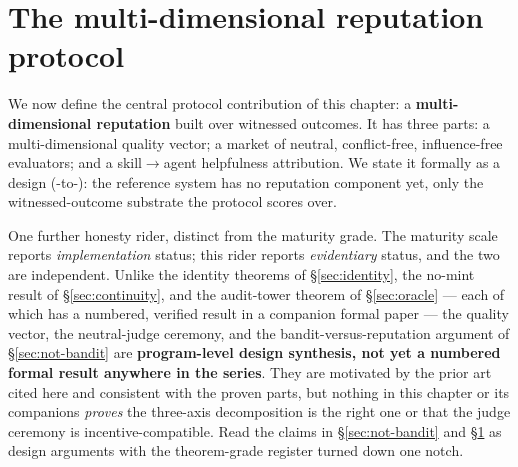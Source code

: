 \documentclass[11pt,a4paper]{article}
\theoremstyle{definition}
\newcounter{protocol}[section]
\begin{document}

\pdexercisepointer{\ref{ex:stp-four-broken-assumptions}}{\ref{ex:stp-arms-race}}{\pageref{ex:stp-four-broken-assumptions}}

\section{The multi-dimensional reputation protocol}\label{sec:adr0049}

We now define the central protocol contribution of this chapter: a
\textbf{multi-dimensional reputation} built over witnessed outcomes. It has three
parts: a multi-dimensional quality vector; a market of neutral, conflict-free,
influence-free evaluators; and a skill$\to$agent helpfulness attribution. We state
it formally as a design (\DESIGNED-to-\VISION): the reference system has no
reputation component yet, only the witnessed-outcome substrate the protocol scores
over.

\noindent One further honesty rider, distinct from the maturity grade. The
maturity scale reports \emph{implementation} status; this rider reports
\emph{evidentiary} status, and the two are independent. Unlike the identity
theorems of \S\ref{sec:identity}, the no-mint result of \S\ref{sec:continuity}, and
the audit-tower theorem of \S\ref{sec:oracle} --- each of which has a numbered,
verified result in a companion formal paper --- the quality vector, the
neutral-judge ceremony, and the bandit-versus-reputation argument of
\S\ref{sec:not-bandit} are \textbf{program-level design synthesis, not yet a
numbered formal result anywhere in the series}. They are motivated by the prior art
cited here and consistent with the proven parts, but nothing in this chapter or its
companions \emph{proves} the three-axis decomposition is the right one or that the
judge ceremony is incentive-compatible. Read the claims in \S\ref{sec:not-bandit}
and \S\ref{sec:adr0049} as design arguments with the theorem-grade register turned
down one notch.
\end{document}
